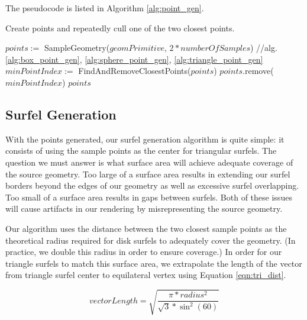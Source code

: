 The pseudocode is listed in Algorithm \ref{alg:point_gen}.

\begin{algorithm}
\captionfont
\caption[Create Points and Cull]{Create points and repeatedly cull one of the two closest points.}
\label{alg:point_gen}
{\fontsize{10}{9}\selectfont
\begin{algorithmic}
      \State $points :=$ SampleGeometry($geomPrimitive$, $2*numberOfSamples$) //alg. \ref{alg:box_point_gen}, \ref{alg:sphere_point_gen}, \ref{alg:triangle_point_gen}
         \State $minPointIndex :=$ FindAndRemoveClosestPoints($points$)
         \State $points$.remove($minPointIndex$)
      \EndWhile
      \State \Return $points$
   \EndFunction
\end{algorithmic}
}
\end{algorithm}

\subsection{Surfel Generation}
\label{sec:surfel_gen}

With the points generated, our surfel generation algorithm is quite simple: it consists of using the sample points as the center for triangular surfels. The question we must answer is what surface area will achieve adequate coverage of the source geometry. Too large of a surface area results in extending our surfel borders beyond the edges of our geometry as well as excessive surfel overlapping. Too small of a surface area results in gaps between surfels. Both of these issues will cause artifacts in our rendering by misrepresenting the source geometry.

Our algorithm uses the distance between the two closest sample points as the theoretical radius required for disk surfels to adequately cover the geometry. (In practice, we double this radius in order to ensure coverage.) In order for our triangle surfels to match this surface area, we extrapolate the length of the vector from triangle surfel center to equilateral vertex using Equation \ref{eqn:tri_dist}.

\begin{equation}
vectorLength = \sqrt{ \frac{ \pi * radius^2 }{ \sqrt{3} * \sin^2(60) } }
\label{eqn:tri_dist}
\end{equation}
~

